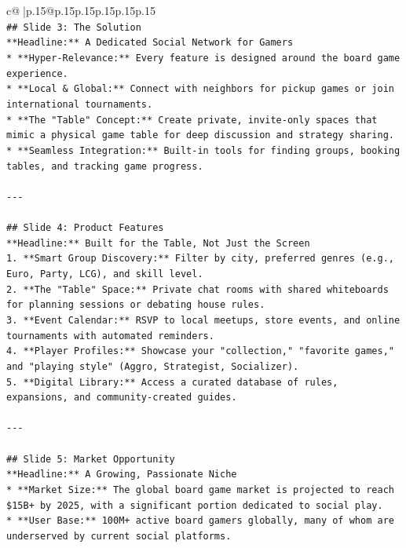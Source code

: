 \documentclass{article}
\begin{document}
{\begin{supertabular}{c@{$\;$}|p{.15\linewidth}@{}p{.15\linewidth}p{.15\linewidth}p{.15\linewidth}p{.15\linewidth}p{.15\linewidth}}
{{{\\ 
\texttt{\#\# Slide 3: The Solution} \\
\texttt{**Headline:** A Dedicated Social Network for Gamers} \\
\texttt{*   **Hyper{-}Relevance:** Every feature is designed around the board game experience.} \\
\texttt{*   **Local \& Global:** Connect with neighbors for pickup games or join international tournaments.} \\
\texttt{*   **The "Table" Concept:** Create private, invite{-}only spaces that mimic a physical game table for deep discussion and strategy sharing.} \\
\texttt{*   **Seamless Integration:** Built{-}in tools for finding groups, booking tables, and tracking game progress.} \\
\\ 
\texttt{{-}{-}{-}} \\
\\ 
\texttt{\#\# Slide 4: Product Features} \\
\texttt{**Headline:** Built for the Table, Not Just the Screen} \\
\texttt{1.  **Smart Group Discovery:** Filter by city, preferred genres (e.g., Euro, Party, LCG), and skill level.} \\
\texttt{2.  **The "Table" Space:** Private chat rooms with shared whiteboards for planning sessions or debating house rules.} \\
\texttt{3.  **Event Calendar:** RSVP to local meetups, store events, and online tournaments with automated reminders.} \\
\texttt{4.  **Player Profiles:** Showcase your "collection," "favorite games," and "playing style" (Aggro, Strategist, Socializer).} \\
\texttt{5.  **Digital Library:** Access a curated database of rules, expansions, and community{-}created guides.} \\
\\ 
\texttt{{-}{-}{-}} \\
\\ 
\texttt{\#\# Slide 5: Market Opportunity} \\
\texttt{**Headline:** A Growing, Passionate Niche} \\
\texttt{*   **Market Size:** The global board game market is projected to reach \$15B+ by 2025, with a significant portion dedicated to social play.} \\
\texttt{*   **User Base:** 100M+ active board gamers globally, many of whom are underserved by current social platforms.} \\
}}}
\end{supertabular}}
\end{document}
